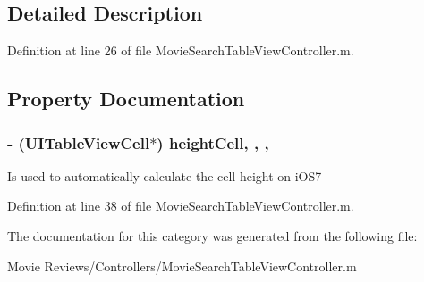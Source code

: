 \subsection{Detailed Description}


Definition at line 26 of file Movie\+Search\+Table\+View\+Controller.\+m.



\subsection{Property Documentation}
\subsubsection[{height\+Cell}]{\setlength{\rightskip}{0pt plus 5cm}-\/ (U\+I\+Table\+View\+Cell$\ast$) height\+Cell\hspace{0.3cm}{\ttfamily [read]}, {\ttfamily [write]}, {\ttfamily [nonatomic]}, {\ttfamily [strong]}}\label{category_movie_search_table_view_controller_07_08_a365030f70f371656b1390e05d431fb12}
Is used to automatically calculate the cell height on i\+O\+S7 

Definition at line 38 of file Movie\+Search\+Table\+View\+Controller.\+m.



The documentation for this category was generated from the following file\+:\begin{DoxyCompactItemize}
\item 
Movie Reviews/\+Controllers/Movie\+Search\+Table\+View\+Controller.\+m\end{DoxyCompactItemize}
